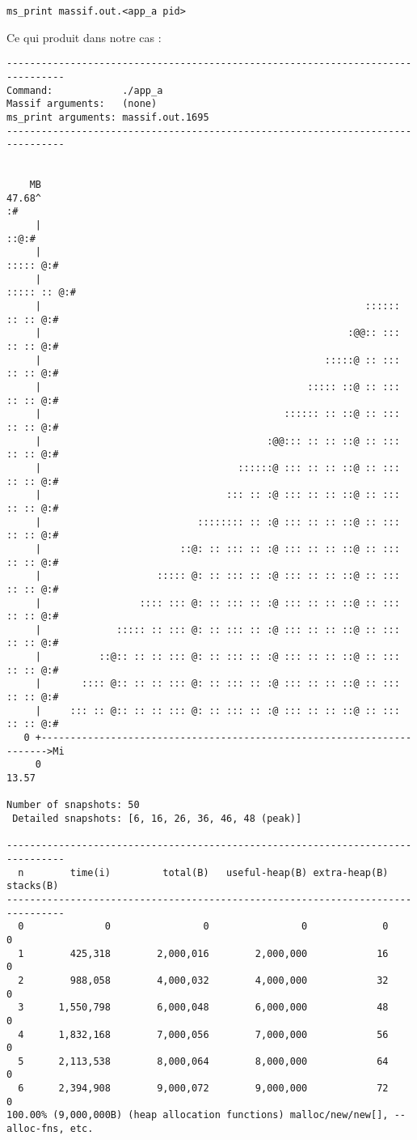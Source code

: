 \begin{lstlisting}
ms_print massif.out.<app_a pid>
\end{lstlisting}
Ce qui produit dans notre cas :
\begin{lstlisting}
--------------------------------------------------------------------------------
Command:            ./app_a
Massif arguments:   (none)
ms_print arguments: massif.out.1695
--------------------------------------------------------------------------------


    MB
47.68^                                                                      :#
     |                                                                   ::@:#
     |                                                               ::::: @:#
     |                                                            ::::: :: @:#
     |                                                        :::::: :: :: @:#
     |                                                     :@@:: ::: :: :: @:#
     |                                                 :::::@ :: ::: :: :: @:#
     |                                              ::::: ::@ :: ::: :: :: @:#
     |                                          :::::: :: ::@ :: ::: :: :: @:#
     |                                       :@@::: :: :: ::@ :: ::: :: :: @:#
     |                                  ::::::@ ::: :: :: ::@ :: ::: :: :: @:#
     |                                ::: :: :@ ::: :: :: ::@ :: ::: :: :: @:#
     |                           :::::::: :: :@ ::: :: :: ::@ :: ::: :: :: @:#
     |                        ::@: :: ::: :: :@ ::: :: :: ::@ :: ::: :: :: @:#
     |                    ::::: @: :: ::: :: :@ ::: :: :: ::@ :: ::: :: :: @:#
     |                 :::: ::: @: :: ::: :: :@ ::: :: :: ::@ :: ::: :: :: @:#
     |             ::::: :: ::: @: :: ::: :: :@ ::: :: :: ::@ :: ::: :: :: @:#
     |          ::@:: :: :: ::: @: :: ::: :: :@ ::: :: :: ::@ :: ::: :: :: @:#
     |       :::: @:: :: :: ::: @: :: ::: :: :@ ::: :: :: ::@ :: ::: :: :: @:#
     |     ::: :: @:: :: :: ::: @: :: ::: :: :@ ::: :: :: ::@ :: ::: :: :: @:#
   0 +----------------------------------------------------------------------->Mi
     0                                                                   13.57

Number of snapshots: 50
 Detailed snapshots: [6, 16, 26, 36, 46, 48 (peak)]

--------------------------------------------------------------------------------
  n        time(i)         total(B)   useful-heap(B) extra-heap(B)    stacks(B)
--------------------------------------------------------------------------------
  0              0                0                0             0            0
  1        425,318        2,000,016        2,000,000            16            0
  2        988,058        4,000,032        4,000,000            32            0
  3      1,550,798        6,000,048        6,000,000            48            0
  4      1,832,168        7,000,056        7,000,000            56            0
  5      2,113,538        8,000,064        8,000,000            64            0
  6      2,394,908        9,000,072        9,000,000            72            0
100.00% (9,000,000B) (heap allocation functions) malloc/new/new[], --alloc-fns, etc.


\end{lstlisting}
